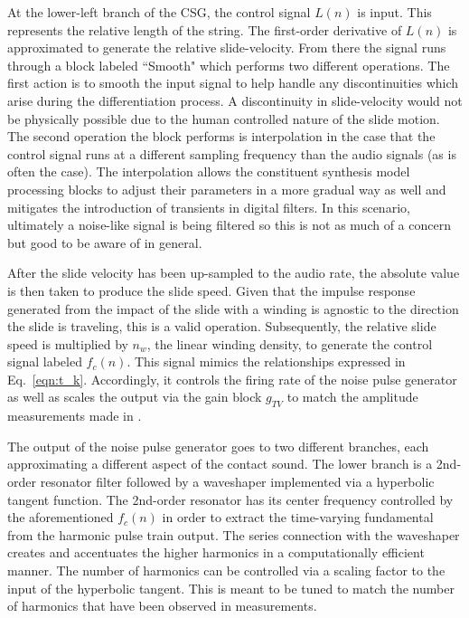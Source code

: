 \documentclass[main.tex]{subfiles}
\begin{document}
At the lower-left branch of the CSG, the control signal $L(n)$ is input. This represents the relative length of the string. The first-order derivative of $L(n)$ is approximated to generate the relative slide-velocity. From there the signal runs through a block labeled ``Smooth" which performs two different operations. The first action is to smooth the input signal to help handle any discontinuities which arise during the differentiation process. A discontinuity in slide-velocity would not be physically possible due to the human controlled nature of the slide motion. The second operation the block performs is interpolation in the case that the control signal runs at a different sampling frequency than the audio signals (as is often the case). The interpolation allows the constituent synthesis model processing blocks to adjust their parameters in a more gradual way as well and mitigates the introduction of transients in digital filters. In this scenario, ultimately a noise-like signal is being filtered so this is not as much of a concern but good to be aware of in general.

After the slide velocity has been up-sampled to the audio rate, the absolute value is then taken to produce the slide speed. Given that the impulse response generated from the impact of the slide with a winding is agnostic to the direction the slide is traveling, this is a valid operation. Subsequently, the relative slide speed is multiplied by $n_w$, the linear winding density, to generate the control signal labeled $f_c(n)$. This signal mimics the relationships expressed in Eq.~\ref{eqn:t_k}. Accordingly, it controls the firing rate of the noise pulse generator as well as scales the output via the gain block $g_{TV}$ to match the amplitude measurements made in .

The output of the noise pulse generator goes to two different branches, each approximating a different aspect of the contact sound. The lower branch is a 2nd-order resonator filter followed by a waveshaper implemented via a hyperbolic tangent function. The 2nd-order resonator has its center frequency controlled by the aforementioned $f_c(n)$ in order to extract the time-varying fundamental from the harmonic pulse train output. The series connection with the waveshaper creates and accentuates the higher harmonics in a computationally efficient manner. The number of harmonics can be controlled via a scaling factor to the input of the hyperbolic tangent. This is meant to be tuned to match the number of harmonics that have been observed in measurements.
\end{document}
